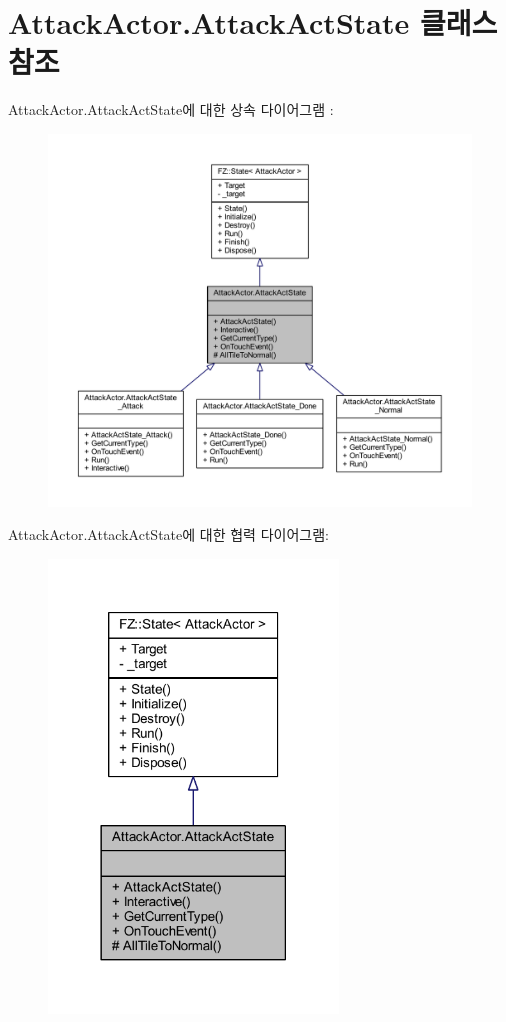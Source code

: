 \hypertarget{class_attack_actor_1_1_attack_act_state}{}\section{Attack\+Actor.\+Attack\+Act\+State 클래스 참조}
\label{class_attack_actor_1_1_attack_act_state}


Attack\+Actor.\+Attack\+Act\+State에 대한 상속 다이어그램 \+: 
\nopagebreak
\begin{figure}[H]
\begin{center}
\leavevmode
\includegraphics[width=350pt]{class_attack_actor_1_1_attack_act_state__inherit__graph}
\end{center}
\end{figure}


Attack\+Actor.\+Attack\+Act\+State에 대한 협력 다이어그램\+:
\nopagebreak
\begin{figure}[H]
\begin{center}
\leavevmode
\includegraphics[width=218pt]{class_attack_actor_1_1_attack_act_state__coll__graph}
\end{center}
\end{figure}
